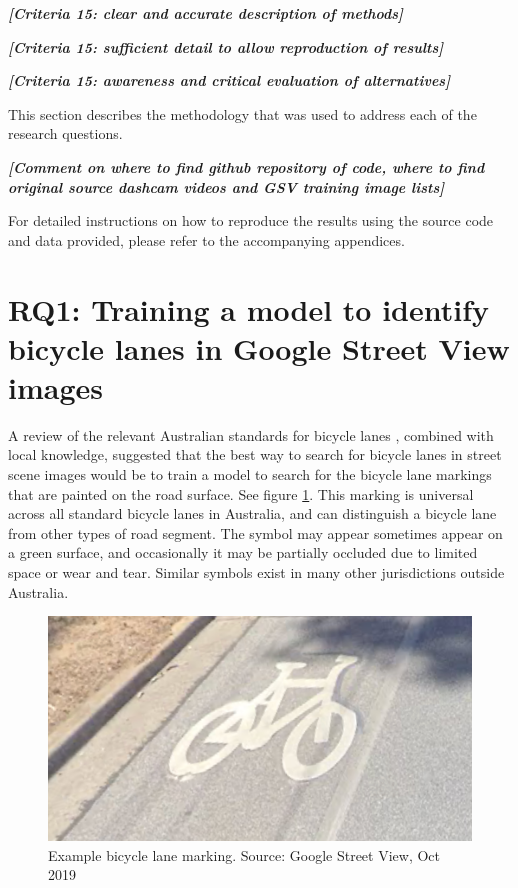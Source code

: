 \documentclass[11pt,twoside]{report}
\newcommand{\remark}[1]{{\bf \em [\marginpar{$\Leftarrow$}#1]}}
\begin{document}
\remark{Criteria 15: clear and accurate description of methods}

\remark{Criteria 15: sufficient detail to allow reproduction of results}

\remark{Criteria 15: awareness and critical evaluation of alternatives}

This section describes the methodology that was used to address each of the research questions.

\remark{Comment on where to find github repository of code, where to find original source dashcam videos and GSV training image lists}

For detailed instructions on how to reproduce the results using the source code and data provided, please refer to the accompanying appendices.

\section{RQ1: Training a model to identify bicycle lanes in Google Street View images}
\label{s:rq1}

A review of the relevant Australian standards for bicycle lanes \cite{standards}, combined with local knowledge, suggested that the best way to search for bicycle lanes in street scene images would be to train a model to search for the bicycle lane markings that are painted on the road surface.  See figure \ref{fig:symbol}.  This marking is universal across all standard bicycle lanes in Australia, and can distinguish a bicycle lane from other types of road segment.  The symbol may appear sometimes appear on a green surface, and occasionally it may be partially occluded due to limited space or wear and tear.  Similar symbols exist in many other jurisdictions outside Australia.

\begin{figure}[h]
\centering
\includegraphics{f001_symbol.png}
\caption{Example bicycle lane marking.  Source: Google Street View, Oct 2019}
\label{fig:symbol}
\end{figure}
\end{document}
